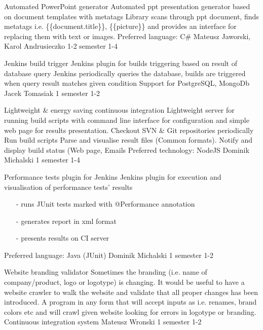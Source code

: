 \begin{project}
{Automated PowerPoint generator}
{Automated ppt presentation generator based on document templates with metatags} 
{ 
Library scans through ppt document, finds metatags i.e. \{\{document.title\}\},
\{\{picture\}\} and provides an interface for replacing them with text or
images.
}
{Preferred language: C\#}
{Mateusz Jaworski, Karol Andrusieczko}
{1-2 semester}
{1-4}
\end{project}
\begin{project}
{Jenkins build trigger}
{Jenkins plugin for builds triggering based on result of database query} 
{ 
Jenkins periodically queries the database, builds are triggered when query result matches given condition
}
{Support for PostgreSQL, MongoDb}
{Jacek Tomasiak}
{1 semester}
{1-2}
\end{project}
\begin{project}
{Lightweight \& energy saving continuous integration}
{Lightweight server for running build scripts with command line interface for configuration and simple web page for results presentation.} 
{ 
Checkout SVN \& Git repositories periodically Run build scripts Parse and
visualise result files (Common formats). Notify and display build status (Web page, Emails }
{Preferred technology: NodeJS}
{Dominik Michalski}
{1 semester}
{1-4}
\end{project}
\begin{project}
{Performance tests plugin for Jenkins}
{Jenkins plugin for execution and visualisation of performance tests' results} 
{ 
\begin{itemize}
\item[-] runs JUnit tests marked with @Performance annotation
\item[-] generates report in xml format
\item[-] presents results on CI server
\end{itemize}
}
{Preferred language: Java (JUnit)}
{Dominik Michalski}
{1 semester}
{1-2}
\end{project}
\begin{project}
{Website branding validator}
{Sometimes the branding (i.e. name of company/product, logo or logotype) is changing. It would be useful to have a website crawler to walk the website and validate that all proper changes has been introduced.} 
{
A program in any form that will accept inputs as i.e. renames, brand colors etc and will crawl given website looking for errors in logotype or branding.
}
{Continuous integration system}
{Mateusz Wronski}
{1 semester}
{1-2}
\end{project}
